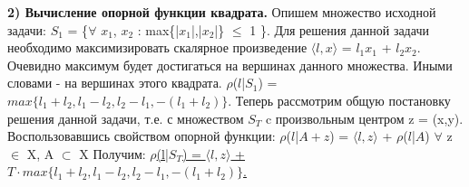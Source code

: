\documentclass[14pt,a4paper]{article}
\begin{document}
	\newpage
	\begin{flushleft}
		{\vspace*{-3cm} \hspace{-2cm}\bf \Large  2) Вычисление опорной функции квадрата.}
		\newline
		\newline
		{\hspace*{-2cm} \large Опишем множество исходной задачи:}		
		\newline
		\newline
		{\hspace*{-1cm}\Large $S_1$ = \{$\forall$ $x_1$, $x_2$ : max\{|$x_1$|,|$x_2$|\} $\leq$ 1   \}.}
		\newline
		\newline
		{\hspace*{-2cm} \large Для решения данной задачи необходимо максимизировать скалярное 
		 \newline \hspace*{-2cm}  произведение \Large{$\langle l, x \rangle$ = $l_1$$x_1$ + $l_2$$x_2$}.}
		\newline
		\newline
		{\hspace*{-2cm} \large Очевидно максимум будет достигаться на вершинах 
		 \newline	\hspace*{-2cm} данного множества. Иными словами - на вершинах этого квадрата. }
		\newline
		\newline
		{\hspace*{-1cm}\Large $\rho$($l$|$S_1$) = $max\{l_1 + l_2,l_1-l_2,l_2 - l_1, -(l_1+l_2)\}$. }
		\newline
		\newline
		{\hspace*{-2cm} \large Теперь рассмотрим общую постановку решения данной задачи, т.е. 
			\newline \hspace*{-2cm} с множеством \Large{$S_T$} c произвольным центром \Large{z = (x,y)}. \large  \newline \hspace*{-2cm} Воспользовавшись свойством опорной функции:}
		\newline
		\newline
		{\hspace*{-1cm}\Large  $\rho$($l$|$A + z$) = $\langle l, z \rangle$ + $\rho$($l$|$A$) \quad $\forall$ z $\in$ X, A $\subset$ X  }
		\newline
		\newline
		{\hspace*{-2cm} \large Получим:}
		\newline
		\newline
		{\hspace*{-1cm}\Large \underline {$\rho$(l|$S_T$) = $\langle l, z \rangle$ + $T \cdot max\{l_1 + l_2,l_1-l_2,l_2 - l_1, -(l_1+l_2)\}$. }}
	\end{flushleft}
\end{document}
